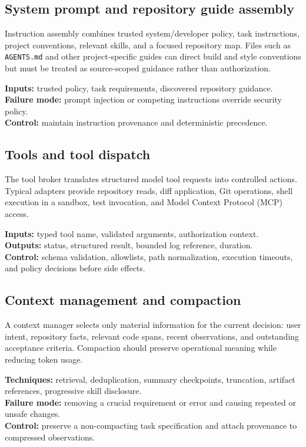 \documentclass[10pt,letterpaper]{article}
\newcommand{\code}[1]{\texttt{#1}}
\begin{document}
\subsection{System prompt and repository guide assembly}
Instruction assembly combines trusted system/developer policy, task instructions, project conventions, relevant skills, and a focused repository map. Files such as \code{AGENTS.md} and other project-specific guides can direct build and style conventions but must be treated as source-scoped guidance rather than authorization.

\textbf{Inputs:} trusted policy, task requirements, discovered repository guidance.\\
\textbf{Failure mode:} prompt injection or competing instructions override security policy.\\
\textbf{Control:} maintain instruction provenance and deterministic precedence.

\subsection{Tools and tool dispatch}
The tool broker translates structured model tool requests into controlled actions. Typical adapters provide repository reads, diff application, Git operations, shell execution in a sandbox, test invocation, and Model Context Protocol (MCP) access.

\textbf{Inputs:} typed tool name, validated arguments, authorization context.\\
\textbf{Outputs:} status, structured result, bounded log reference, duration.\\
\textbf{Control:} schema validation, allowlists, path normalization, execution timeouts, and policy decisions before side effects.

\subsection{Context management and compaction}
A context manager selects only material information for the current decision: user intent, repository facts, relevant code spans, recent observations, and outstanding acceptance criteria. Compaction should preserve operational meaning while reducing token usage.

\textbf{Techniques:} retrieval, deduplication, summary checkpoints, truncation, artifact references, progressive skill disclosure.\\
\textbf{Failure mode:} removing a crucial requirement or error and causing repeated or unsafe changes.\\
\textbf{Control:} preserve a non-compacting task specification and attach provenance to compressed observations.
\end{document}
